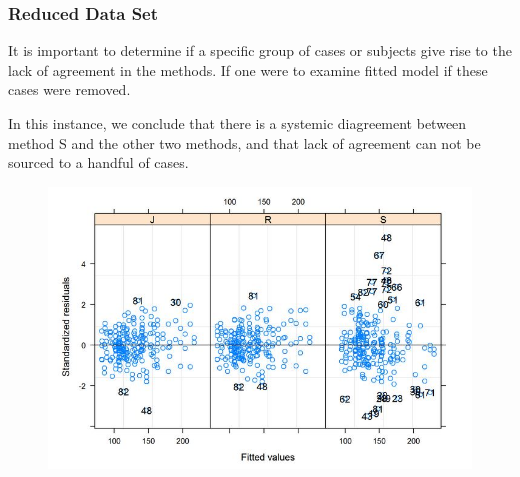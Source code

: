 \documentclass[12pt, a4paper]{report}
\theoremstyle{plain}
\theoremstyle{definition}
\theoremstyle{remark}
\begin{document}
	
	
	
	\subsubsection{Reduced Data Set}
	It is important to determine if a specific group of cases or subjects give rise to the lack of agreement in the methods. If one were to examine fitted model if these cases were removed.
	
	In this instance, we conclude that there is a systemic diagreement between method S and the other two methods, and that lack of agreement can not be sourced to a handful of cases.
	\begin{figure}[h!]
		\centering
		\includegraphics[width=0.7\linewidth]{images/bloodnlmeResidPlot2B}
	\end{figure}
	
	
	
	
	
	
	
	
	
	
	
\end{document}
